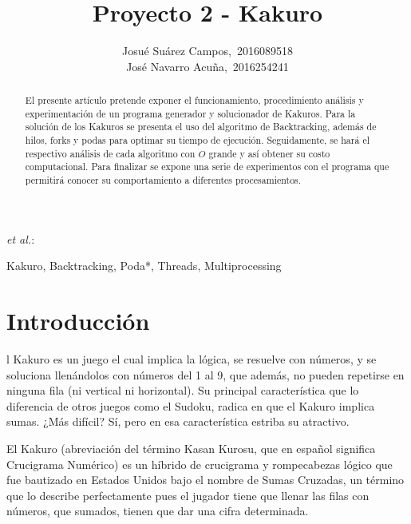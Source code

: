 \documentclass[journal]{IEEEtran}
\begin{document}
\title{Proyecto 2 - Kakuro}


\author{Josué Suárez Campos,~2016089518\\
       José Navarro Acuña,~2016254241 }
 
{\MakeLowercase{\textit{et al.}}:}

\maketitle


\begin{abstract}
El presente artículo pretende exponer el funcionamiento, procedimiento análisis y experimentación de un programa generador y solucionador de Kakuros. Para la solución de los Kakuros se presenta el uso del algoritmo de Backtracking, además de hilos, forks y podas para optimar su tiempo de ejecución. Seguidamente, se hará el respectivo análisis de cada algoritmo con $O$ grande y así obtener su costo computacional. Para finalizar se expone una serie de experimentos con el programa que permitirá conocer su comportamiento a diferentes procesamientos.
\end{abstract}

\renewcommand{\IEEEkeywordsname}{Palabra clave}
\begin{IEEEkeywords}
Kakuro, Backtracking, Poda*, Threads, Multiprocessing
\end{IEEEkeywords}



\IEEEpeerreviewmaketitle



\section{Introducción}

l Kakuro es un juego el cual implica la lógica, se resuelve con números, y se soluciona llenándolos con números del 1 al 9, que además, no pueden repetirse en ninguna fila (ni vertical ni horizontal). Su principal característica que lo diferencia de otros juegos como el Sudoku, radica en que el Kakuro implica sumas. ¿Más difícil? Sí, pero en esa característica estriba su atractivo.
	
	El Kakuro (abreviación del término Kasan Kurosu, que en español significa Crucigrama Numérico) es un híbrido de crucigrama y rompecabezas lógico que fue bautizado en Estados Unidos bajo el nombre de Sumas Cruzadas, un término que lo describe perfectamente pues el jugador tiene que llenar las filas con números, que sumados, tienen que dar una cifra determinada.
	
\end{document}
